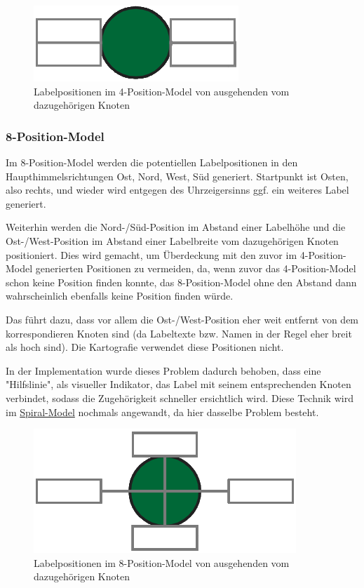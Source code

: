 \begin{figure}[H]
    \centering
    \includegraphics[scale=0.55]{../img/4pos}
    \caption{Labelpositionen im 4-Position-Model von ausgehenden vom dazugehörigen Knoten}
    \label{fig:4pos}
\end{figure}

\subsubsection{8-Position-Model}
\label{subsubsec:8pos}
Im 8-Position-Model werden die potentiellen Labelpositionen in den Haupthimmelsrichtungen Ost, Nord, West, Süd generiert.
Startpunkt ist Osten, also rechts, und wieder wird entgegen des Uhrzeigersinns ggf. ein weiteres Label generiert.

Weiterhin werden die Nord-/Süd-Position im Abstand einer Labelhöhe und die Ost-/West-Position im Abstand einer Labelbreite vom dazugehörigen Knoten positioniert.
Dies wird gemacht, um Überdeckung mit den zuvor im 4-Position-Model generierten Positionen zu vermeiden, da, wenn zuvor das 4-Position-Model schon keine Position finden konnte,
das 8-Position-Model ohne den Abstand dann wahrscheinlich ebenfalls keine Position finden würde.

Das führt dazu, dass vor allem die Ost-/West-Position eher weit entfernt von dem korrespondieren Knoten sind (da Labeltexte bzw. Namen in der Regel eher breit als hoch sind).
Die Kartografie verwendet diese Positionen nicht.\cite{cartography}

In der Implementation wurde dieses Problem dadurch behoben, dass eine "Hilfslinie", als visueller Indikator, das Label mit seinem entsprechenden Knoten verbindet,
sodass die Zugehörigkeit schneller ersichtlich wird.
Diese Technik wird im \hyperref[subsubsec:spiral]{Spiral-Model} nochmals angewandt, da hier dasselbe Problem besteht.

\begin{figure}[H]
    \centering
    \includegraphics[scale=0.55]{../img/8pos}
    \caption{Labelpositionen im 8-Position-Model von ausgehenden vom dazugehörigen Knoten}
    \label{fig:8pos}
\end{figure}

